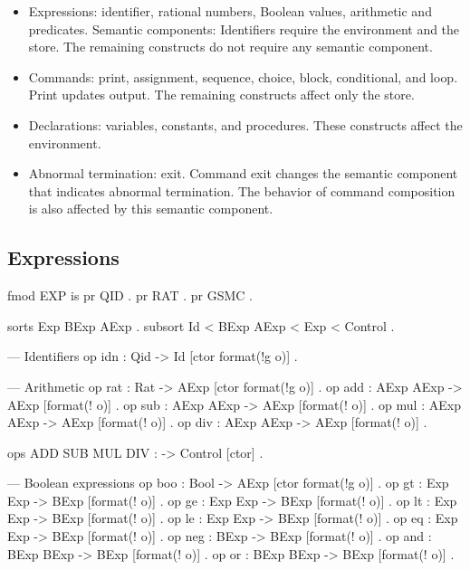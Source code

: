 \documentclass{llncs}%
\begin{document}
\begin{itemize}

\item Expressions: identifier, rational numbers, Boolean values,
arithmetic and predicates. Semantic components: Identifiers require
the environment and the store. The remaining constructs do not require
any semantic component.

\item Commands: print, assignment, sequence, choice, block,
conditional, and loop. Print updates output. The remaining constructs
affect only the store.

\item Declarations: variables, constants, and procedures. These
constructs affect the environment.

\item Abnormal termination: exit. Command exit changes the semantic
component that indicates abnormal termination. The behavior of command
composition is also affected by this semantic component.

\end{itemize}

\subsection{Expressions}
\nwenddocs{}\endmoddef\nwstartdeflinemarkup\nwenddeflinemarkup
fmod EXP is
    pr QID .
    pr RAT .
    pr GSMC .  

    sorts Exp BExp AExp .
    subsort Id < BExp AExp < Exp < Control .

    --- Identifiers
    op idn : Qid -> Id [ctor format(!g o)] .
    
    --- Arithmetic
    op rat : Rat -> AExp [ctor format(!g o)] .
    op add : AExp AExp -> AExp [format(! o)] .
    op sub : AExp AExp -> AExp [format(! o)] .
    op mul : AExp AExp -> AExp [format(! o)] .
    op div : AExp AExp -> AExp [format(! o)] .

    ops ADD SUB MUL DIV : -> Control [ctor] .

    --- Boolean expressions
    op boo : Bool -> AExp [ctor format(!g o)] .
    op gt : Exp Exp -> BExp [format(! o)] .
    op ge : Exp Exp -> BExp [format(! o)] .
    op lt : Exp Exp -> BExp [format(! o)] .
    op le : Exp Exp -> BExp [format(! o)] .
    op eq : Exp Exp -> BExp [format(! o)] .
    op neg : BExp -> BExp [format(! o)] .
    op and : BExp BExp -> BExp [format(! o)] .
    op or : BExp BExp -> BExp [format(! o)] .
\end{document}
